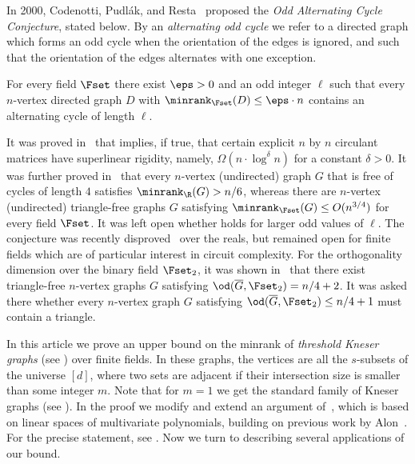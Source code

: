 In 2000, Codenotti, Pudl{\'{a}}k, and Resta~\cite{CodenottiPR00} proposed the
\emph{Odd Alternating Cycle Conjecture}, stated below.
By an \emph{alternating odd cycle} we refer to a directed graph which forms an odd cycle when the orientation of the edges is ignored, and such that the orientation of the edges alternates with one exception.
\begin{conjecture}\label{conj:alternating}
For every field $\Fset$ there exist $\eps >0$ and an odd integer $\ell$ such that every $n$-vertex directed graph $D$ with ${\minrank}_{\Fset} (D)  \leq \eps \cdot n$ contains an alternating cycle of length $\ell$.
\end{conjecture}

It was proved in~\cite{CodenottiPR00} that  implies, if true, that certain explicit $n$ by $n$ circulant matrices have superlinear rigidity,
%
namely, $\Omega( n \cdot \log^\delta n)$ for a constant $\delta>0$.
%
%
%
%
%
%
%
It was further proved in~\cite{CodenottiPR00} that every $n$-vertex (undirected) graph $G$ that is free of cycles of length $4$ satisfies ${\minrank}_{\R}(G) > n/6$, whereas
%
there are $n$-vertex (undirected) triangle-free graphs $G$ satisfying ${\minrank}_{\Fset}(G) \leq O(n^{3/4})$ for every field $\Fset$.
%
It was left open whether
%
holds  %
for larger
%
odd
values of $\ell$.
%
%
The conjecture was recently disproved~\cite{Haviv18free} over the reals, %
but remained open for finite fields which are of %
particular %
interest in circuit complexity.
For the orthogonality dimension over the binary field $\Fset_2$, it was shown in~\cite{CodenottiPR00} that there exist triangle-free $n$-vertex graphs $G$ satisfying $\od(\overline{G},\Fset_2) = n/4+2$. It was asked there whether every $n$-vertex graph $G$ satisfying $\od(\overline{G},\Fset_2) \leq n/4+1$ must contain a triangle.

In this article
we prove %
an upper bound %
on the minrank
%
%
of \emph{threshold Kneser graphs}  %
(see )  %
over finite fields.  %
In these graphs, the vertices are all the $s$-subsets of %
the  %
universe $[d]$, where two sets are adjacent if their intersection size is smaller than some integer $m$. Note that for $m=1$ we get the standard family of Kneser graphs (see ).
In the proof we modify and extend an argument of~\cite{Haviv18free}, which is based on linear spaces of multivariate polynomials, building on
%
previous work by  %
Alon~\cite{AlonUnion98}. For the precise statement, see .  %
Now we  %
turn to %
describing %
several applications of our bound.

